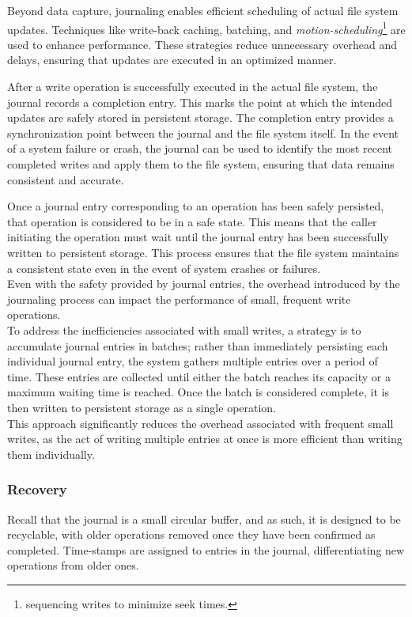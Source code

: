 \documentclass{report}
\newcommand{\asideBegin}[1]{\begin{tcolorbox}[colback=orange!5!white,colframe=black!75!orange,title={Aside:
      #1}]}
\newcommand{\asideEnd}{\end{tcolorbox}}
\begin{document}
Beyond data capture, journaling enables efficient scheduling of actual file system
updates. Techniques like write-back caching, batching, and
\textit{motion-scheduling}\footnote{sequencing writes to minimize seek times.} are used to enhance
performance. These strategies reduce unnecessary overhead and delays, ensuring that updates are
executed in an optimized manner.

After a write operation is successfully executed in the actual file system, the journal records a
completion entry. This marks the point at which the intended updates are safely stored in persistent
storage. The completion entry provides a synchronization point between the journal and the file
system itself. In the event of a system failure or crash, the journal can be used to identify the
most recent completed writes and apply them to the file system, ensuring that data remains
consistent and accurate.

\asideBegin{Batched Entries}
Once a journal entry corresponding to an operation has been safely persisted, that operation is
considered to be in a safe state. This means that the caller initiating the operation must wait
until the journal entry has been successfully written to persistent storage. This process ensures
that the file system maintains a consistent state even in the event of system crashes or failures. \\

Even with the safety provided by journal entries, the overhead introduced by the journaling process
can impact the performance of small, frequent write operations. \\

To address the inefficiencies associated with small writes, a strategy is to accumulate journal
entries in batches; rather than immediately persisting each individual journal entry, the system
gathers multiple entries over a period of time. These entries are collected until either the batch
reaches its capacity or a maximum waiting time is reached. Once the batch is considered complete, it
is then written to persistent storage as a single operation. \\

This approach significantly reduces the overhead associated with frequent small writes, as the act
of writing multiple entries at once is more efficient than writing them individually. \\
\asideEnd


\subsubsection{Recovery}
Recall that the journal is a small circular buffer, and as such, it is designed to be recyclable,
with older operations removed once they have been confirmed as completed. Time-stamps are assigned
to entries in the journal, differentiating new operations from older ones.
\end{document}
